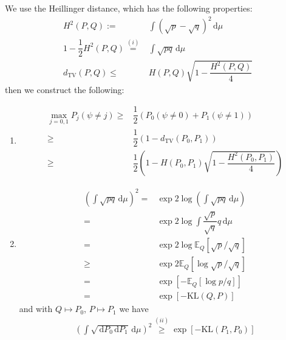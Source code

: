 \documentclass[11pt,a4paper]{ctexart}
\numberwithin{equation}{section}%
\begin{document}
\section{}

We use the Heillinger distance, which has the following properties:
\begin{align*}
    H^2(P,Q):=&\int(\sqrt{p}-\sqrt{q})^2\,\mathrm{d}\mu\\
    1-\dfrac{ 1 }{ 2 } H^2(P,Q)\mathop{ = }\limits^{(i)} & \int \sqrt{pq}\,\mathrm{d}\mu\\
    d_\mathrm{ TV }(P,Q)\leq& H(P,Q)\sqrt{1-\dfrac{ H^2(P,Q) }{ 4 } }
\end{align*}
then we construct the following:
\begin{enumerate}[topsep=2pt,itemsep=2pt]
    \item 
    \begin{align*}
        \mathop{ \max }\limits_{j=0,1}P_j(\psi\neq j)\geq & \dfrac{ 1 }{ 2 } \left(P_0(\psi\neq 0)+P_1(\psi\neq 1)\right)\\
        \geq & \dfrac{ 1 }{ 2 } \left( 1- d_\mathrm{ TV }(P_0,P_1) \right)\\
        \geq& \dfrac{ 1 }{ 2 } \left( 1- H(P_0,P_1)\sqrt{1-\dfrac{ H^2(P_0,P_1) }{ 4 } } \right)  
    \end{align*}
    \item 
    \begin{align*}
         \left(\int \sqrt{pq}\,\mathrm{d}\mu\right)^2 =& \exp 2\log\left( \int \sqrt{pq}\,\mathrm{d}\mu \right)\\
         =& \exp 2\log \int \dfrac{ \sqrt{p} }{ \sqrt{q} } q\,\mathrm{d}\mu\\
         =& \exp 2\log \mathbb{E}_Q\left[ \sqrt{p}/\sqrt{q} \right] \\
         \geq & \exp 2\mathbb{E}_Q\left[ \log \sqrt{p}/\sqrt{q} \right] \\
         =& \exp\left[ -\mathbb{E}_Q\left[ \log p/q \right]  \right]\\
         =& \exp\left[ -\mathrm{KL}(Q,P) \right]
    \end{align*}
    and with $ Q\mapsto P_0$, $ P\mapsto P_1 $ we have
    \begin{align*}
        \left(\int \sqrt{\,\mathrm{d}P_0 \,\mathrm{d}P_1}\,\mathrm{d}\mu\right)^2 \mathop{ \geq }\limits^{(ii)}  \exp\left[ -\mathrm{ KL }(P_1,P_0) \right]
    \end{align*}
    

\end{enumerate}
\end{document}
